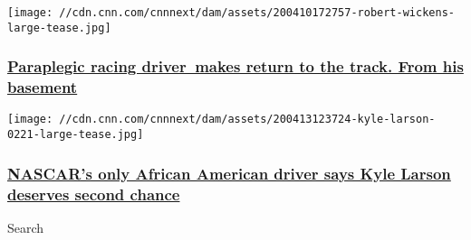 \href{/2020/04/13/motorsport/indycar-robert-wickens-coronavirus-spt-intl/index.html}{}

\texttt{[image: //cdn.cnn.com/cnnnext/dam/assets/200410172757-robert-wickens-large-tease.jpg]}

\hypertarget{paraplegic-racing-driver-makes-return-to-the-track-from-his-basement}{%
\subsubsection{\texorpdfstring{\href{/2020/04/13/motorsport/indycar-robert-wickens-coronavirus-spt-intl/index.html}{Paraplegic
racing driver~makes return to the track. From his
basement}}{Paraplegic racing driver~makes return to the track. From his basement}}\label{paraplegic-racing-driver-makes-return-to-the-track-from-his-basement}}

\href{/2020/04/17/motorsport/nascar-larson-bubba-wallace-spt-intl/index.html}{}

\texttt{[image: //cdn.cnn.com/cnnnext/dam/assets/200413123724-kyle-larson-0221-large-tease.jpg]}

\hypertarget{nascars-only-african-american-driver-says-kyle-larson-deserves-second-chance}{%
\subsubsection{\texorpdfstring{\href{/2020/04/17/motorsport/nascar-larson-bubba-wallace-spt-intl/index.html}{NASCAR's
only African American driver says Kyle Larson deserves second
chance}}{NASCAR's only African American driver says Kyle Larson deserves second chance}}\label{nascars-only-african-american-driver-says-kyle-larson-deserves-second-chance}}

Search

